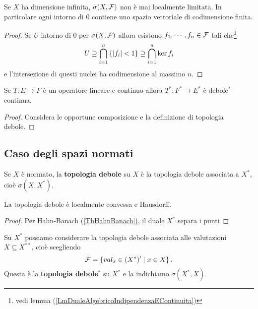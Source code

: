 \begin{remark}
Se $X$ ha dimensione infinita, $\sigma(X,\mathcal{F})$ non \`e mai localmente limitata. In particolare ogni intorno di $0$ contiene uno spazio vettoriale di codimensione finita.
\end{remark}
\begin{proof}
Se $U$ intorno di $0$ per $\sigma(X,\mathcal{F})$ allora esistono $f_1,\cdots,f_n\in\mathcal{F}$ tali che\footnote{vedi lemma (\ref{LmDualeAlgebricoIndipendenzaEContinuita})}
\[U\supseteq \bigcap_{i=1}^n\left\{{\left|{f_i}\right|<1}\right\}\supseteq \bigcap_{i=1}^n \ker f_i\]
e l'intersezione di questi nuclei ha codimensione al massimo $n$.
\end{proof}

\begin{proposition}\label{PrDualeOperatoreContinuoEDeboleStarContinua}
Se $T:E\to F$ \`e un operatore lineare e continuo allora $T^\ast:F^\ast\to E^\ast$ \`e debole$^\ast$-continua.
\end{proposition}
\begin{proof}
Considera le opportune composizione e la definizione di topologia debole.
\end{proof}

\subsection{Caso degli spazi normati}

\begin{definition}
Se $X$ \`e normato, la \textbf{topologia debole} su $X$ \`e la topologia debole associata a $X^\ast$, cio\`e $\sigma(X,X^\ast)$.
\end{definition}

\begin{proposition}
La topologia debole \`e localmente convessa e Hausdorff.
\end{proposition}
\begin{proof}
Per Hahn-Banach (\ref{ThHahnBanach}), il duale $X^\ast$ separa i punti
\end{proof}


\begin{definition}
Su $X^\ast$ possiamo considerare la topologia debole associata alle valutazioni $X\subseteq X^{\ast\ast}$, cio\`e scegliendo
\[\mathcal{F}=\left\{{val_x\in (X^\ast)'\mid x\in X}\right\}.\]
Questa \`e la \textbf{topologia debole$^\ast$} su $X^\ast$ e la indichiamo $\sigma(X^\ast,X)$.
\end{definition}

